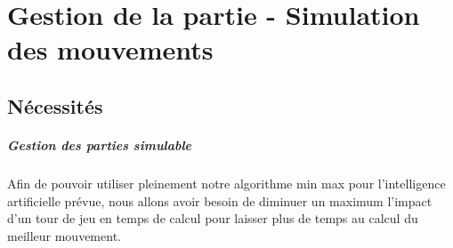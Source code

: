 \documentclass{scrreprt}
\begin{document}












    \chapter{Gestion de la partie - Simulation des mouvements}

    \section{Nécessités}

    \paragraph{Gestion des parties simulable}
    Afin de pouvoir utiliser pleinement notre algorithme min max pour
    l'intelligence artificielle prévue, nous allons avoir besoin de diminuer
    un maximum l'impact d'un tour de jeu en temps de calcul pour laisser plus
    de temps au calcul du meilleur mouvement.
\end{document}
